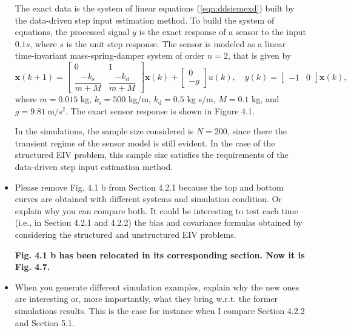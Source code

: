 \documentclass[11pt]{article}
\begin{document}
\begin{itemize}
    The exact data is the system of linear equations (\ref{eqn:ddsiemexd}) built by the data-driven step input estimation method.
    To build the system of equations, the processed signal ${y}$ is the exact response of a sensor to the input $0.1s$, where $s$ is the unit step response.  
    The sensor is modeled as a linear time-invariant mass-spring-damper system of order $n = 2$, that is given by 
    \begin{equation} \tag{4.38}
    \mathbf{x}(k+1) = \begin{bmatrix} 0 & 1 \\ \dfrac{-k_{\mathrm{s}}}{m+M} & \dfrac{-k_{\mathrm{d}}}{m+M} \end{bmatrix} \mathbf{x}(k) + \begin{bmatrix} 0\\ -g\end{bmatrix} u(k),  
    \quad y(k) = \begin{bmatrix} -1 & 0 \end{bmatrix} \mathbf{x}(k), \label{eqn:msdst}
    \end{equation}
    where $m=0.015$ kg, $k_{\mathrm{s}}=500$ kg/m, $k_{\mathrm{d}}=0.5$ kg s/m, $M=0.1$ kg, and $g=9.81 \ \mathrm{m/s^2}$.   
    The exact sensor response is shown in Figure 4.1.

    In the simulations, the sample size considered is $N=200$, since there the transient regime of the sensor model is still evident. 
    In the case of the structured EIV problem, this sample size satisfies the requirements of the data-driven step input estimation method. 
    \color{black}

    
    \item Please remove Fig. 4.1 b from Section 4.2.1 because the top and bottom curves are obtained with different systems and simulation condition. Or explain why you can compare both. It could be interesting to test each time (i.e., in Section 4.2.1 and 4.2.2) the bias and covariance formulas obtained by considering the structured and unstructured EIV problems. 
    
    {\bfseries Fig. 4.1 b has been relocated in its corresponding section. Now it is Fig. 4.7.}
    
    \item  When you generate different simulation examples, explain why the new ones are interesting or, more importantly, what they bring w.r.t. the former simulations results. This is the case for instance when I compare Section 4.2.2 and Section 5.1. 
    

\end{itemize}
\end{document}
